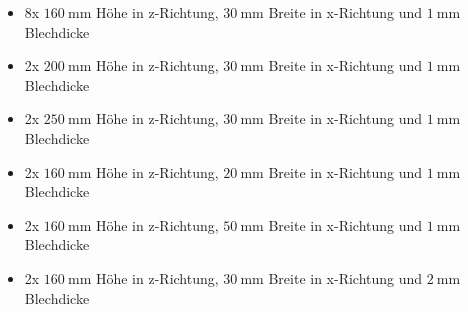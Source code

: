 \begin{itemize}
	\item 8x $\SI{160}{\milli\meter}$ H\"ohe in z-Richtung, $\SI{30}{\milli\meter}$ Breite in x-Richtung und $\SI{1}{\milli\meter}$ Blechdicke
	\item 2x $\SI{200}{\milli\meter}$ H\"ohe in z-Richtung, $\SI{30}{\milli\meter}$ Breite in x-Richtung und $\SI{1}{\milli\meter}$ Blechdicke
	\item 2x $\SI{250}{\milli\meter}$ H\"ohe in z-Richtung, $\SI{30}{\milli\meter}$ Breite in x-Richtung und $\SI{1}{\milli\meter}$ Blechdicke
	\item 2x $\SI{160}{\milli\meter}$ H\"ohe in z-Richtung, $\SI{20}{\milli\meter}$ Breite in x-Richtung und $\SI{1}{\milli\meter}$ Blechdicke
	\item 2x $\SI{160}{\milli\meter}$ H\"ohe in z-Richtung, $\SI{50}{\milli\meter}$ Breite in x-Richtung und $\SI{1}{\milli\meter}$ Blechdicke
	\item 2x $\SI{160}{\milli\meter}$ H\"ohe in z-Richtung, $\SI{30}{\milli\meter}$ Breite in x-Richtung und $\SI{2}{\milli\meter}$ Blechdicke
\end{itemize}
